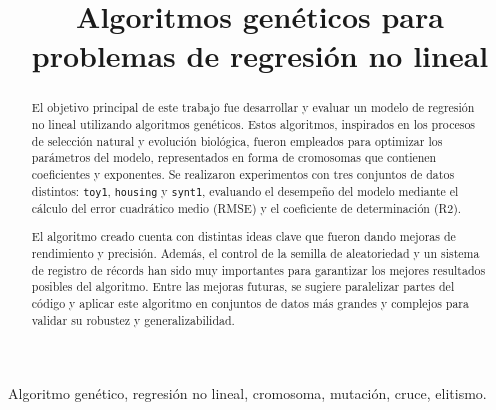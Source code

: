 \documentclass[conference,a4paper]{IEEEtran}
\begin{document}
\title{Algoritmos genéticos para problemas de regresión no lineal}

\author{
  
  \and
  
}

\maketitle


\begin{abstract}  
El objetivo principal de este trabajo fue desarrollar y evaluar un modelo de regresión no lineal utilizando algoritmos genéticos. Estos algoritmos, inspirados en los procesos de selección natural y evolución biológica, fueron empleados para optimizar los parámetros del modelo, representados en forma de cromosomas que contienen coeficientes y exponentes. Se realizaron experimentos con tres conjuntos de datos distintos: \texttt{toy1}, \texttt{housing} y \texttt{synt1}, evaluando el desempeño del modelo mediante el cálculo del error cuadrático medio (RMSE) y el coeficiente de determinación (R2).

El algoritmo creado cuenta con distintas ideas clave que fueron dando mejoras de rendimiento y precisión. Además, el control de la semilla de aleatoriedad y un sistema de registro de récords han sido muy importantes para garantizar los mejores resultados posibles del algoritmo. Entre las mejoras futuras, se sugiere paralelizar partes del código y aplicar este algoritmo en conjuntos de datos más grandes y complejos para validar su robustez y generalizabilidad.
\end{abstract}


\begin{IEEEkeywords}
    Algoritmo genético, regresión no lineal, cromosoma, mutación, cruce, elitismo.
\end{IEEEkeywords}
\end{document}
